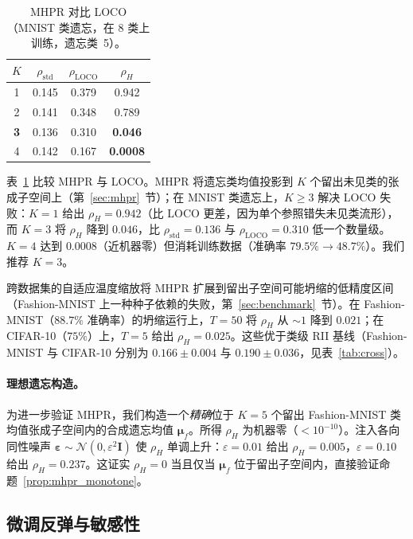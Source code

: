 \begin{table}[t]
\centering
\small
\caption{MHPR 对比 LOCO（MNIST 类遗忘，在 8 类上训练，遗忘类~5）。}\label{tab:mhpr}
\setlength{\tabcolsep}{2pt}
\begin{tabular}{c c c c}
\toprule
$K$ & $\rho_{\mathrm{std}}$ & $\rho_{\mathrm{LOCO}}$ & $\rho_H$ \\
\midrule
1 & 0.145 & 0.379 & 0.942 \\
2 & 0.141 & 0.348 & 0.789 \\
\textbf{3} & 0.136 & 0.310 & \textbf{0.046} \\
4 & 0.142 & 0.167 & \textbf{0.0008} \\
\bottomrule
\end{tabular}
\end{table}

表~\ref{tab:mhpr} 比较 MHPR 与 LOCO。MHPR 将遗忘类均值投影到 $K$ 个留出未见类的张成子空间上（第~\ref{sec:mhpr}~节）；在 MNIST 类遗忘上，$K\ge3$ 解决 LOCO 失败：$K{=}1$ 给出 $\rho_H{=}0.942$（比 LOCO 更差，因为单个参照错失未见类流形），而 $K{=}3$ 将 $\rho_H$ 降到 $0.046$，比 $\rho_{\mathrm{std}}{=}0.136$ 与 $\rho_{\mathrm{LOCO}}{=}0.310$ 低一个数量级。$K{=}4$ 达到 $0.0008$（近机器零）但消耗训练数据（准确率 $79.5\%{\to}48.7\%$）。我们推荐 $K{=}3$。

跨数据集的自适应温度缩放将 MHPR 扩展到留出子空间可能坍缩的低精度区间（Fashion-MNIST 上一种种子依赖的失败，第~\ref{sec:benchmark}~节）。在 Fashion-MNIST（$88.7\%$ 准确率）的坍缩运行上，$T{=}50$ 将 $\rho_H$ 从 $\sim1$ 降到 $0.021$；在 CIFAR-10（$75\%$）上，$T{=}5$ 给出 $\rho_H{=}0.025$。这些优于类级 RII 基线（Fashion-MNIST 与 CIFAR-10 分别为 $0.166{\pm}0.004$ 与 $0.190{\pm}0.036$，见表~\ref{tab:cross}）。

\paragraph{理想遗忘构造。}为进一步验证 MHPR，我们构造一个\emph{精确}位于 $K{=}5$ 个留出 Fashion-MNIST 类均值张成子空间内的合成遗忘均值 $\boldsymbol{\mu}_f$。所得 $\rho_H$ 为机器零（$<10^{-10}$）。注入各向同性噪声 $\boldsymbol{\varepsilon}\sim\mathcal{N}(0,\varepsilon^2\mathbf{I})$ 使 $\rho_H$ 单调上升：$\varepsilon{=}0.01$ 给出 $\rho_H{=}0.005$，$\varepsilon{=}0.10$ 给出 $\rho_H{=}0.237$。这证实 $\rho_H{=}0$ 当且仅当 $\boldsymbol{\mu}_f$ 位于留出子空间内，直接验证命题~\ref{prop:mhpr_monotone}。

\subsection{微调反弹与敏感性}
\label{sec:rebound}

